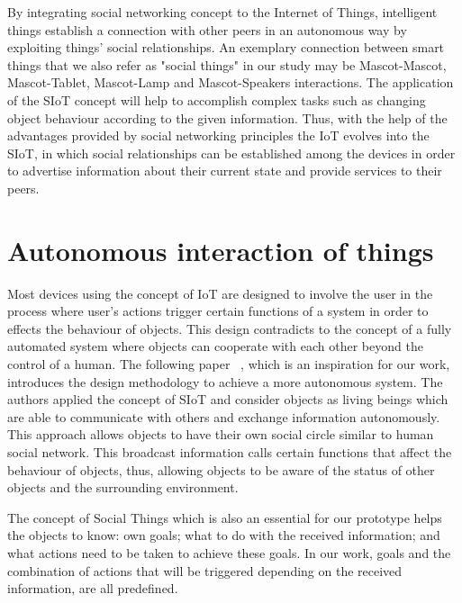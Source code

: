 \par By integrating social networking concept to the Internet of Things, intelligent things
establish a connection with other peers in an autonomous way by exploiting things' social relationships.
An exemplary connection between smart things that we also refer as "social things" in our
study may be Mascot-Mascot, Mascot-Tablet, Mascot-Lamp and Mascot-Speakers interactions.
The application of the SIoT concept will help to accomplish complex tasks such as changing
object behaviour according to the given information.
Thus, with the help of the advantages provided by social networking principles
the IoT evolves into the SIoT, in which social relationships can be established among
the devices in order to advertise information about their current state and provide services to their peers.

\section{Autonomous interaction of things}
\label{sec:Autonomous interaction of things}
Most devices using the concept of IoT are designed to involve the user in the process
where user's actions trigger certain functions of a system in order to effects the behaviour of objects.
This design contradicts to the concept of a fully automated system where objects
can cooperate with each other beyond the control of a human.
The following paper ~\cite{okada2016autonomous}, which is an inspiration for our work,
introduces the design methodology to achieve a more autonomous system.
The authors applied the concept of SIoT and consider objects as living beings which are
able to communicate with others and exchange information autonomously.
This approach allows objects to have their own social circle similar to human social network.
This broadcast information calls certain functions that affect the behaviour of objects,
thus, allowing objects to be aware of the status of other objects and the surrounding environment.

\par The concept of Social Things which is also an essential for our prototype helps the objects to know: own goals;
what to do with the received information;
and what actions need to be taken to achieve these goals.
In our work, goals and the combination of actions that will be triggered
depending on the received information, are all predefined.

